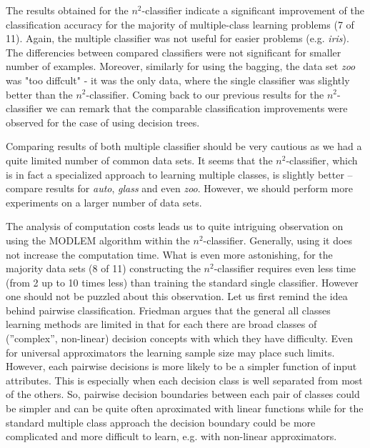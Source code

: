 \documentclass{llncs}
\begin{document}
The results obtained for the $n^2$-classifier indicate a significant
improvement of the classification accuracy for the majority of
multiple-class learning problems (7 of 11). Again, the multiple classifier
was not useful for easier problems (e.g. \emph{iris}). The differencies
between compared classifiers were not significant for smaller number of
examples. Moreover, similarly for using the bagging, the data set \emph{zoo}
was "too diffcult" - it was the only data, where the single classifier was
slightly better than the $n^2$-classifier. Coming back to our previous
results for the $n^2$-classifier \cite{JelStef98} we can remark that the
comparable classification improvements were observed for the case of using
decision trees.

Comparing results of both multiple classifier should be very cautious as we
had a quite limited number of common data sets. It seems that the
$n^2$-classifier, which is in fact a specialized approach to learning
multiple classes, is slightly better -- compare results for \emph{auto},
\emph{glass} and even \emph{zoo}. However, we should perform more
experiments on a larger number of data sets.

The analysis of computation costs leads us to quite intriguing observation
on using the MODLEM algorithm within the $n^2$-classifier. Generally, using
it does not increase the computation time. What is even more astonishing,
for the majority data sets (8 of 11) constructing the $n^2$-classifier
requires even less time (from 2 up to 10 times less) than training the
standard single classifier. However one should not be puzzled about this
observation. Let us first remind the idea behind pairwise classification.
Friedman argues \cite{Friedman} that the general all classes learning
methods  are limited in that for each there are broad classes of
(''complex'', non-linear) decision concepts with which they have difficulty.
Even for universal approximators the learning sample size may place such
limits. However, each pairwise decisions is more likely to be a simpler
function of input attributes. This is especially when each decision class is
well separated from most of the others. So, pairwise decision boundaries
between each pair of classes could be simpler and can be quite often
aproximated with linear functions while for the standard multiple class
approach the decision boundary could be more complicated and more difficult
to learn, e.g. with non-linear approximators.
\end{document}
